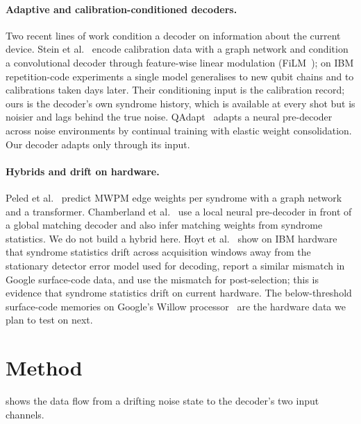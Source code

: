 \documentclass[11pt,a4paper]{article}
\begin{document}
\paragraph{Adaptive and calibration-conditioned decoders.}
Two recent lines of work condition a decoder on information about the current device. Stein et
al.~\cite{stein2026film} encode calibration data with a graph network and condition a convolutional decoder
through feature-wise linear modulation (FiLM~\cite{perez2018film}); on IBM repetition-code experiments a single
model generalises to new qubit chains and to calibrations taken days later. Their conditioning input is the
calibration record; ours is the decoder's own syndrome history, which is available at every shot but is noisier
and lags behind the true noise. QAdapt~\cite{miao2026qadapt} adapts a neural pre-decoder across noise
environments by continual training with elastic weight consolidation. Our decoder adapts only through its input.

\paragraph{Hybrids and drift on hardware.}
Peled et al.~\cite{peled2026nmwpm} predict MWPM edge weights per syndrome with a graph network and a
transformer. Chamberland et al.~\cite{chamberland2026predecoder} use a local neural pre-decoder in front of a
global matching decoder and also infer matching weights from syndrome statistics. We do not build a hybrid here.
Hoyt et al.~\cite{hoyt2026compat} show on IBM hardware that syndrome statistics drift across acquisition windows
away from the stationary detector error model used for decoding, report a similar mismatch in Google surface-code
data, and use the mismatch for post-selection; this is evidence that
syndrome statistics drift on current hardware. The below-threshold surface-code memories on Google's Willow
processor~\cite{google2025below} are the hardware data we plan to test on next.

\section{Method}\label{sec:method}

 shows the data flow from a drifting noise state to the decoder's two input channels.
\end{document}
